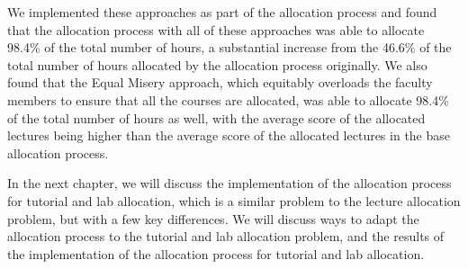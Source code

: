 We implemented these approaches as part of the allocation process and found that the allocation process with all of these approaches was able to allocate 98.4\% of the total number of hours, a substantial increase from the 46.6\% of the total number of hours allocated by the allocation process originally. We also found that the Equal Misery approach, which equitably overloads the faculty members to ensure that all the courses are allocated, was able to allocate 98.4\% of the total number of hours as well, with the average score of the allocated lectures being higher than the average score of the allocated lectures in the base allocation process.

In the next chapter, we will discuss the implementation of the allocation process for tutorial and lab allocation, which is a similar problem to the lecture allocation problem, but with a few key differences. We will discuss ways to adapt the allocation process to the tutorial and lab allocation problem, and the results of the implementation of the allocation process for tutorial and lab allocation.
